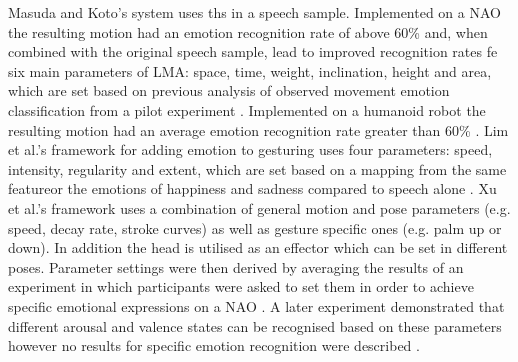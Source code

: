 \documentclass[11pt]{article}
\begin{document}
Masuda and Koto's system uses ths in a speech sample. Implemented on a NAO the resulting motion had an emotion recognition rate of above 60\% and, when combined with the original speech sample, lead to improved recognition rates fe six main parameters of LMA: space, time, weight, inclination, height and area, which are set based on previous analysis of observed movement emotion classification from a pilot experiment \cite{masuda2009emotion}. Implemented on a humanoid robot the resulting motion had an average emotion recognition rate greater than 60\% \cite{masuda2010motion}. Lim et al.'s framework for adding emotion to gesturing uses four parameters: speed, intensity, regularity and extent, which are set based on a mapping from the same featureor the emotions of happiness and sadness compared to speech alone \cite{lim2011converting}. Xu et al.'s framework uses a combination of general motion and pose parameters (e.g. speed, decay rate, stroke curves) as well as gesture specific ones (e.g. palm up or down). In addition the head is utilised as an effector which can be set in different poses. Parameter settings were then derived by averaging the results of an experiment in which participants were asked to set them in order to achieve specific emotional expressions on a NAO \cite{xu2013mood}. A later experiment demonstrated that different arousal and valence states can be recognised based on these parameters however no results for specific emotion recognition were described \cite{xu2013bodily}.
\end{document}
